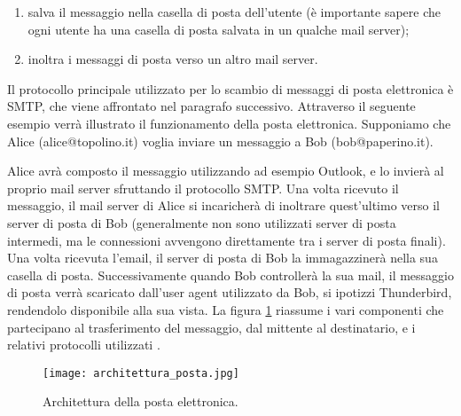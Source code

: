\begin{enumerate}
    \item salva il messaggio nella casella di posta dell'utente (è importante sapere che ogni utente ha una casella di posta salvata in un qualche mail server);
    \item inoltra i messaggi di posta verso un altro mail server.
\end{enumerate}

Il protocollo principale utilizzato per lo scambio di messaggi di posta elettronica è SMTP, 
che viene affrontato nel paragrafo successivo.
Attraverso il seguente esempio verrà illustrato il funzionamento della posta elettronica.
Supponiamo che Alice (alice@topolino.it) voglia inviare un messaggio a Bob (bob@paperino.it).

Alice avrà composto il messaggio utilizzando ad esempio Outlook, e lo invierà al proprio mail server 
sfruttando il protocollo SMTP. Una volta ricevuto il messaggio, il mail server di Alice si incaricherà di 
inoltrare quest'ultimo verso il server di posta di Bob (generalmente non sono utilizzati server di posta intermedi, 
ma le connessioni avvengono direttamente tra i server di posta finali). 
Una volta ricevuta l'email, il server di posta di Bob la immagazzinerà nella sua casella di posta. 
Successivamente quando Bob controllerà la sua mail, il messaggio di posta verrà scaricato dall'user agent 
utilizzato da Bob, si ipotizzi Thunderbird, rendendolo disponibile alla sua vista.
La figura \ref{architetturaPosta} riassume i vari componenti che partecipano al trasferimento del messaggio, dal
mittente al destinatario, e i relativi protocolli utilizzati \cite{kurose2008reti}.

\begin{figure}[htp]
    \centering
    \texttt{[image: architettura\_posta.jpg]}
        \caption{Architettura della posta elettronica.}\label{architetturaPosta}
  \end{figure}



